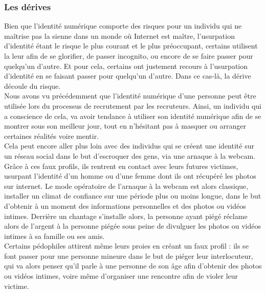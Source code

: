 \documentclass[12pt]{report}
\begin{document}
\newpage
\subsubsection{Les dérives}
Bien que l'identité numérique comporte des risques pour un individu qui ne maîtrise pas la sienne dans un monde où Internet est maître, l'usurpation d'identité étant le risque le plus courant et le plus préoccupant, certains utilisent la leur afin de se glorifier, de passer incognito, ou encore de se faire passer pour quelqu'un d'autre. Et pour cela, certains ont justement recours à l'usurpation d'identité en se faisant passer pour quelqu'un d'autre. Dans ce cas-là, la dérive découle du risque.\\

Nous avons vu précédemment que l'identité numérique d'une personne peut être utilisée lors du processus de recrutement par les recruteurs. Ainsi, un individu qui a conscience de cela, va avoir tendance à utiliser son identité numérique afin de se montrer sous son meilleur jour, tout en n'hésitant pas à masquer ou arranger certaines réalités voire mentir.\\

Cela peut encore aller plus loin avec des individus qui se créent une identité sur un réseau social dans le but d'escroquer des gens, via une arnaque à la webcam. Grâce à ces faux profils, ils rentrent en contact avec leurs futures victimes, usurpant l’identité d’un homme ou d’une femme dont ils ont récupéré les photos sur internet. Le mode opératoire de l’arnaque à la webcam est alors classique, installer un climat de confiance sur une période plus ou moins longue,  dans le but d’obtenir à un moment des informations personnelles et des photos ou vidéos intimes. Derrière un chantage s'installe alors, la personne ayant piégé réclame alors de l'argent à la personne piégée sous peine de divulguer les photos ou vidéos intimes à sa famille ou ses amis.\\

Certains pédophiles attirent même leurs proies en créant un faux profil : ils se font passer pour une personne mineure dans le but de piéger leur interlocuteur, qui va alors penser qu'il parle à une personne de son âge afin d'obtenir des photos ou vidéos intimes, voire même d'organiser une rencontre afin de violer leur victime.
\end{document}

